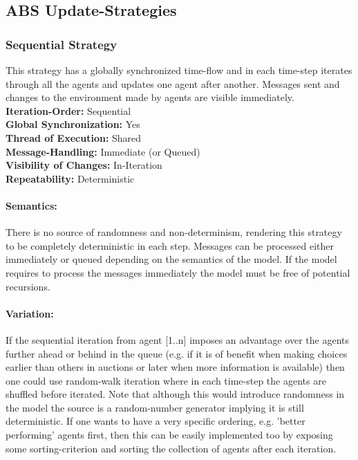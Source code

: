 \subsection{ABS Update-Strategies}

\subsubsection{Sequential Strategy}
This strategy has a globally synchronized time-flow and in each time-step iterates through all the agents and updates one agent after another. Messages sent and changes to the environment made by agents are visible immediately. \\

\textbf{Iteration-Order:} Sequential \\
\textbf{Global Synchronization:} Yes \\
\textbf{Thread of Execution:} Shared \\
\textbf{Message-Handling:} Immediate (or Queued) \\
\textbf{Visibility of Changes:}	In-Iteration \\
\textbf{Repeatability:}	Deterministic
	
\paragraph{Semantics:} There is no source of randomness and non-determinism, rendering this strategy to be completely deterministic in each step. Messages can be processed either immediately or queued depending on the semantics of the model. If the model requires to process the messages immediately the model must be free of potential recursions.

\paragraph{Variation:} If the sequential iteration from agent [1..n] imposes an advantage over the agents further ahead or behind in the queue (e.g. if it is of benefit when making choices earlier than others in auctions or later when more information is available) then one could use random-walk iteration where in each time-step the agents are shuffled before iterated. Note that although this would introduce randomness in the model the source is a random-number generator implying it is still deterministic. If one wants to have a very specific ordering, e.g. 'better performing' agents first, then this can be easily implemented too by exposing some sorting-criterion and sorting the collection of agents after each iteration. \\


